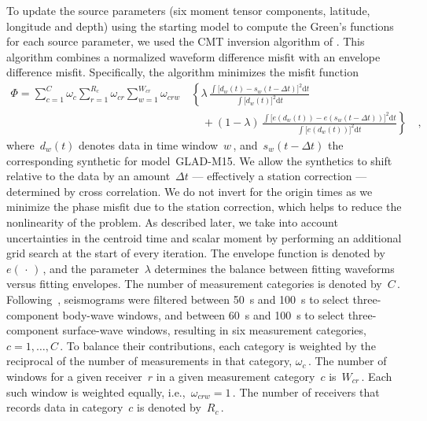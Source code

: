 \documentclass[extra,mreferee]{gji}
\begin{document}
To update the source parameters (six moment tensor components, latitude, longitude and depth) using the starting model to compute the Green's functions for each source parameter,
we used the CMT inversion algorithm of \cite{liu2004spectral}.
This algorithm combines a normalized waveform difference misfit with an envelope difference misfit.
Specifically, the algorithm minimizes the misfit function
\begin{equation}
   \begin{split}
      \Phi =  \sum\limits_{c=1}^{C} \omega_c \sum\limits_{r=1}^{R_c} \omega_{cr}
       \sum\limits_{w=1}^{W_{cr}} \omega_{crw}\,
          & \left\{ \lambda\, \frac
              { \int \big[ d_w(t) - s_w(t - \Delta t) \big]^2 \mathrm{d}t}
              {\int \big[ d_w(t) \big]^2  \mathrm{d}t} \right.
       \\ & \quad \left. \mbox{} + (1 - \lambda)\, \frac
              {\int \big[ e(d_w(t)) - e(s_w(t - \Delta t)) \big]^2 \mathrm{d}t}
              {\int \big[ e(d_w(t)) \big]^2\mathrm{d}t} \right\}
              \quad ,
   \end{split}
\end{equation}
where~$d_w(t)$ denotes data in time window~$w$\,,
and~$s_w(t - \Delta t)$ the corresponding synthetic for model~GLAD-M15.
We allow the synthetics to shift relative to the data by an amount~$\Delta t$
--- effectively a station correction --- determined by cross correlation. We do not invert for the origin times as we minimize the phase misfit due to the station correction, which helps to reduce the nonlinearity of the problem.
As described later, we take into account uncertainties in the centroid time and scalar moment by performing an additional grid search at the start of every iteration.
The envelope function is denoted by~$e(\,\cdot\,)$\,,
and the parameter~$\lambda$ determines the balance between fitting waveforms versus fitting envelopes.
The number of measurement categories is denoted by~$C$\,.
Following~\cite{ekstrom2012global},
seismograms were filtered between 50~s and 100~s
to select three-component body-wave windows,
and between 60~s and 100~s to select three-component
surface-wave windows,
resulting in six measurement categories, $c=1,\ldots,C$\,.
To balance their contributions,
each category is weighted by the reciprocal of the number of measurements in that
category, $\omega_c$\,.
The number of windows for a given receiver~$r$ in a given measurement category~$c$ is~$W_{cr}$\,.
Each such window is weighted equally, i.e.,~$\omega_{crw}=1$\,.
The number of receivers that records data in category~$c$ is denoted by~$R_c$\,.
\end{document}
